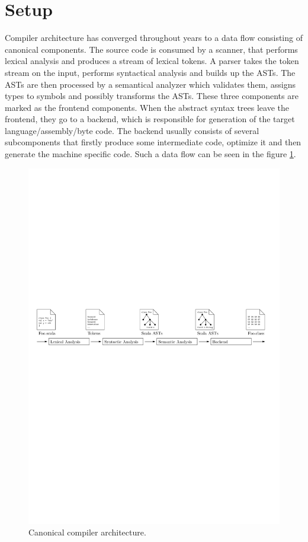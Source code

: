 \documentclass[12pt,a4paper]{report}
\begin{document}
\section{Setup}

Compiler architecture has converged throughout years to a data flow consisting of canonical components. The source code is consumed by a scanner, that performs lexical analysis and produces a stream of lexical tokens. A parser takes the token stream on the input, performs syntactical analysis and builds up the ASTs. The ASTs are then processed by a semantical analyzer which validates them, assigns types to symbols and possibly transforms the ASTs. These three components are marked as the frontend components. When the abstract syntax trees leave the frontend, they go to a backend, which is responsible for generation of the target language/assembly/byte code. The backend usually consists of several subcomponents that firstly produce some intermediate code, optimize it and then generate the machine specific code. Such a data flow can be seen in the figure \ref{Compiler}.

\begin{figure}[ht]
  \centering
	\includegraphics[width=\linewidth,height=\textheight,keepaspectratio]{img/Compiler.pdf}
	\caption{Canonical compiler architecture.}
	\label{Compiler}
\end{figure}
\end{document}
